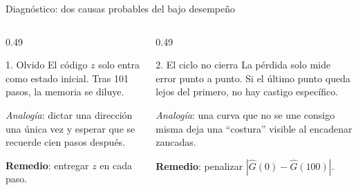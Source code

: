 \documentclass[aspectratio=169,10pt,t]{beamer}
\begin{document}
\begin{frame}{Diagnóstico: dos causas probables del bajo desempeño}
\begin{columns}[T]
\begin{column}{0.49\textwidth}
\begin{alertblock}{1. Olvido}
El código $z$ solo entra como estado inicial. Tras 101 pasos, la memoria se diluye.

\smallskip
\emph{Analogía}: dictar una dirección una única vez y esperar que se recuerde cien pasos después.

\smallskip
\textbf{Remedio}: entregar $z$ en cada paso.
\end{alertblock}
\end{column}
\begin{column}{0.49\textwidth}
\begin{alertblock}{2. El ciclo no cierra}
La pérdida solo mide error punto a punto. Si el último punto queda lejos del primero, no hay castigo específico.

\smallskip
\emph{Analogía}: una curva que no se une consigo misma deja una ``costura'' visible al encadenar zancadas.

\smallskip
\textbf{Remedio}: penalizar $|\hat G(0)-\hat G(100)|$.
\end{alertblock}
\end{column}
\end{columns}
\vspace{2pt}
\centering
{}
\hspace{0.3cm}{\scriptsize Ilustración esquemática.}
\end{frame}
\end{document}
